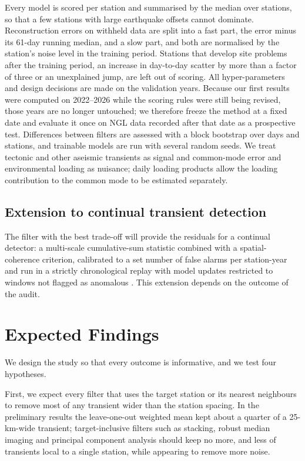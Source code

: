 \documentclass[11pt,a4paper]{article}
\begin{document}
Every model is scored per station and summarised by the median over stations, so that a few stations with large earthquake offsets cannot dominate. Reconstruction errors on withheld data are split into a fast part, the error minus its 61-day running median, and a slow part, and both are normalised by the station's noise level in the training period. Stations that develop site problems after the training period, an increase in day-to-day scatter by more than a factor of three or an unexplained jump, are left out of scoring. All hyper-parameters and design decisions are made on the validation years. Because our first results were computed on 2022--2026 while the scoring rules were still being revised, those years are no longer untouched; we therefore freeze the method at a fixed date and evaluate it once on NGL data recorded after that date as a prospective test. Differences between filters are assessed with a block bootstrap over days and stations, and trainable models are run with several random seeds. We treat tectonic and other aseismic transients as signal and common-mode error and environmental loading as nuisance; daily loading products \citep{li2025loading} allow the loading contribution to the common mode to be estimated separately.

\subsection{Extension to continual transient detection}
\label{sec:continual}

The filter with the best trade-off will provide the residuals for a continual detector: a multi-scale cumulative-sum statistic combined with a spatial-coherence criterion, calibrated to a set number of false alarms per station-year and run in a strictly chronological replay with model updates restricted to windows not flagged as anomalous \citep{kirkpatrick2017}. This extension depends on the outcome of the audit.

\section{Expected Findings}

We design the study so that every outcome is informative, and we test four hypotheses.

First, we expect every filter that uses the target station or its nearest neighbours to remove most of any transient wider than the station spacing. In the preliminary results the leave-one-out weighted mean kept about a quarter of a 25-km-wide transient; target-inclusive filters such as stacking, robust median imaging and principal component analysis should keep no more, and less of transients local to a single station, while appearing to remove more noise.
\end{document}

